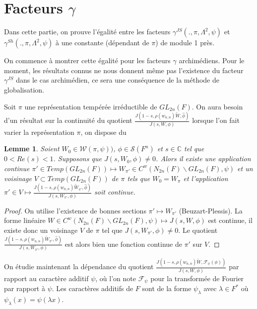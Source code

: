 \documentclass{amsart}
\newtheorem{lemme}{Lemme}[section]
\begin{document}
 \section{Facteurs $\gamma$}
 
 Dans cette partie, on prouve l'égalité entre les facteurs $\gamma^{JS}(., \pi, \Lambda^2, \psi)$ et $\gamma^{Sh}(., \pi, \Lambda^2, \psi)$ à une constante (dépendant de $\pi$) de module 1 près.
 
 On commence à montrer cette égalité pour les facteurs $\gamma$ archimédiens. Pour le moment, les résultats connus ne nous donnent même pas l'existence du facteur $\gamma^{JS}$ dans le cas archimédien, ce sera une conséquence de la méthode de globalisation.
 
 Soit $\pi$ une représentation tempérée irréductible de $GL_{2n}(F)$. On aura besoin d'un résultat sur la continuité du quotient $\frac{J(1-s, \rho(w_{n,n})\tilde{W}, \hat{\phi})}{J(s, W, \phi)}$ lorsque l'on fait varier la représentation $\pi$, on dispose du
 \begin{lemme}
 \label{cont}
 Soient $W_0 \in \mathcal{W}(\pi, \psi))$, $\phi \in \mathcal{S}(F^n)$ et $s \in \mathbb{C}$ tel que $0 < Re(s) < 1$. Supposons que $J(s, W_0, \phi) \neq 0$. Alors il existe une application continue  $\pi' \in Temp(GL_{2n}(F)) \mapsto W_{\pi'} \in C^w(N_{2n}(F)\backslash{GL_{2n}(F)}, \psi)$ et un voisinage $V \subset Temp(GL_{2n}(F))$ de $\pi$ tels que $W_0 = W_\pi$ et l'application $\pi' \in V \mapsto \frac{J(1-s, \rho(w_{n,n})\tilde{W}_{\pi'}, \hat{\phi})}{J(s, W_{\pi'}, \phi)}$ soit continue.
 \end{lemme}
 
 \begin{proof}
 On utilise l'existence de bonnes sections $\pi' \mapsto W_{\pi'}$ (Beuzart-Plessis). La forme linéaire $W \in C^w(N_{2n}(F)\backslash{GL_{2n}(F)}, \psi) \mapsto J(s, W, \phi)$ est continue, il existe donc un voisinage $V$ de $\pi$ tel que $J(s, W_{\pi'}, \phi) \neq 0$. Le quotient $\frac{J(1-s, \rho(w_{n,n})\tilde{W}_{\pi'}, \hat{\phi})}{J(s, W_{\pi'}, \phi)}$ est alors bien une fonction continue de $\pi'$ sur $V$. 
 \end{proof}
 
 On étudie maintenant la dépendance du quotient $\frac{J(1-s, \rho(w_{n,n})\tilde{W}, \mathcal{F}_\psi(\phi))}{J(s, W, \phi)}$ par rapport au caractère additif $\psi$, où l'on note $\mathcal{F}_\psi$ pour la transformée de Fourier par rapport à $\psi$. Les caractères additifs de $F$ sont de la forme $\psi_\lambda$ avec $\lambda \in F^*$ où $\psi_\lambda(x) = \psi(\lambda x)$.
 
\end{document}
